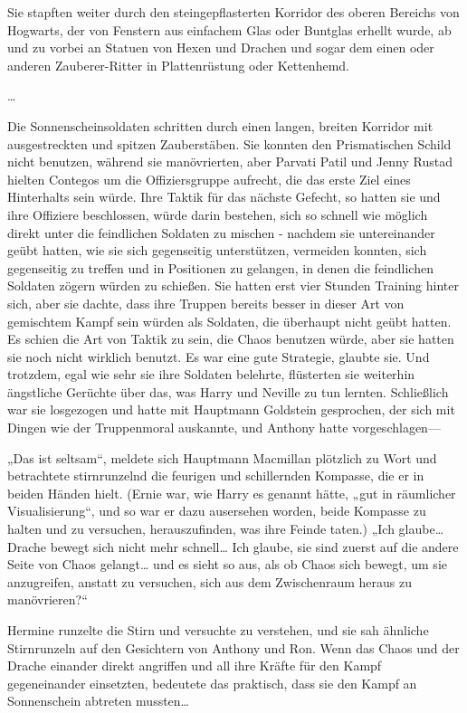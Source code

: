 {Sie stapften weiter durch den steingepflasterten Korridor des oberen Bereichs von Hogwarts, der von Fenstern aus einfachem Glas oder Buntglas erhellt wurde, ab und zu vorbei an Statuen von Hexen und Drachen und sogar dem einen oder anderen Zauberer-Ritter in Plattenrüstung oder Kettenhemd.

…

Die Sonnenscheinsoldaten schritten durch einen langen, breiten Korridor mit ausgestreckten und spitzen Zauberstäben. Sie konnten den Prismatischen Schild nicht benutzen, während sie manövrierten, aber Parvati Patil und Jenny Rustad hielten Contegos um die Offiziersgruppe aufrecht, die das erste Ziel eines Hinterhalts sein würde. Ihre Taktik für das nächste Gefecht, so hatten sie und ihre Offiziere beschlossen, würde darin bestehen, sich so schnell wie möglich direkt unter die feindlichen Soldaten zu mischen - nachdem sie untereinander geübt hatten, wie sie sich gegenseitig unterstützen, vermeiden konnten, sich gegenseitig zu treffen und in Positionen zu gelangen, in denen die feindlichen Soldaten zögern würden zu schießen. Sie hatten erst vier Stunden Training hinter sich, aber sie dachte, dass ihre Truppen bereits besser in dieser Art von gemischtem Kampf sein würden als Soldaten, die überhaupt nicht geübt hatten. Es schien die Art von Taktik zu sein, die Chaos benutzen würde, aber sie hatten sie noch nicht wirklich benutzt. Es war eine gute Strategie, glaubte sie. Und trotzdem, egal wie sehr sie ihre Soldaten belehrte, flüsterten sie weiterhin ängstliche Gerüchte über das, was Harry und Neville zu tun lernten. Schließlich war sie losgezogen und hatte mit Hauptmann Goldstein gesprochen, der sich mit Dingen wie der Truppenmoral auskannte, und Anthony hatte vorgeschlagen—

„Das ist seltsam“, meldete sich Hauptmann Macmillan plötzlich zu Wort und betrachtete stirnrunzelnd die feurigen und schillernden Kompasse, die er in beiden Händen hielt. (Ernie war, wie Harry es genannt hätte, „gut in räumlicher Visualisierung“, und so war er dazu ausersehen worden, beide Kompasse zu halten und zu versuchen, herauszufinden, was ihre Feinde taten.) „Ich glaube…Drache bewegt sich nicht mehr schnell… Ich glaube, sie sind zuerst auf die andere Seite von Chaos gelangt… und es sieht so aus, als ob Chaos sich bewegt, um sie anzugreifen, anstatt zu versuchen, sich aus dem Zwischenraum heraus zu manövrieren?“

Hermine runzelte die Stirn und versuchte zu verstehen, und sie sah ähnliche Stirnrunzeln auf den Gesichtern von Anthony und Ron. Wenn das Chaos und der Drache einander direkt angriffen und all ihre Kräfte für den Kampf gegeneinander einsetzten, bedeutete das praktisch, dass sie den Kampf an Sonnenschein abtreten mussten…

}
